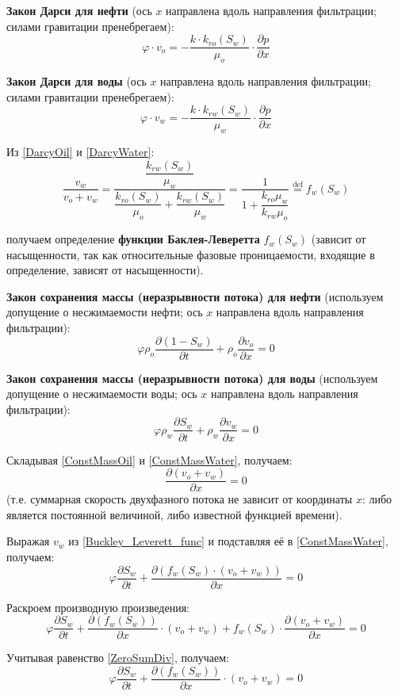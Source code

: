 \documentclass[a4paper,14pt]{extarticle}
\newcommand{\beq}{\begin{equation}}
\newcommand{\eeq}{\end{equation}}
\begin{document}
\textbf{Закон Дарси для нефти} (ось $x$ направлена вдоль направления фильтрации; силами гравитации пренебрегаем):
\beq\label{DarcyOil}
\varphi\cdot v_o=-\frac{k\cdot k_{ro}(S_w)}{\mu_o}\cdot\frac{\partial p}{\partial x}
\eeq

\textbf{Закон Дарси для воды} (ось $x$ направлена вдоль направления фильтрации; силами гравитации пренебрегаем):
\beq\label{DarcyWater}
\varphi\cdot v_w=-\frac{k\cdot k_{rw}(S_w)}{\mu_w}\cdot\frac{\partial p}{\partial x}
\eeq

Из \eqref{DarcyOil} и \eqref{DarcyWater}:
\beq\label{Buckley_Leverett_func}
\dfrac{v_w}{v_o+v_w}=\dfrac{\dfrac{k_{rw}(S_w)}{\mu_w}}{\dfrac{k_{ro}(S_w)}{\mu_o}+\dfrac{k_{rw}(S_w)}{\mu_w}}=\frac{1}{1+\dfrac{k_{ro}\mu_w}{k_{rw}\mu_o}}\stackrel{\text{def}}{=}f_w(S_w)
\eeq

получаем определение \textbf{функции Баклея-Леверетта} $f_w(S_w)$ (зависит от насыщенности, так как относительные фазовые проницаемости, входящие в определение, зависят от насыщенности).

\textbf{Закон сохранения массы (неразрывности потока) для нефти} (используем допущение о несжимаемости нефти; ось $x$ направлена вдоль направления фильтрации):
\beq\label{ConstMassOil}
\varphi\rho_{o}\frac{\partial\left(1-S_w\right)}{\partial t}+\rho_o\frac{\partial v_o}{\partial x}=0
\eeq

\textbf{Закон сохранения массы (неразрывности потока) для воды} (используем допущение о несжимаемости воды; ось $x$ направлена вдоль направления фильтрации):
\beq\label{ConstMassWater}
\varphi\rho_{w}\frac{\partial S_w}{\partial t}+\rho_w\frac{\partial v_w}{\partial x}=0
\eeq

Складывая \eqref{ConstMassOil} и \eqref{ConstMassWater}, получаем:
\beq\label{ZeroSumDiv}
\frac{\partial\left(v_o+v_w\right)}{\partial x}=0
\eeq
(т.е. суммарная скорость двухфазного потока не зависит от координаты $x$: либо является постоянной величиной, либо известной функцией времени).

Выражая $v_w$ из \eqref{Buckley_Leverett_func} и подставляя её в \eqref{ConstMassWater}, получаем:
\beq
\varphi\frac{\partial S_w}{\partial t}+\frac{\partial\!\left(f_w(S_w)\cdot(v_o+v_w)\right)}{\partial x}=0
\eeq

Раскроем производную произведения:
\beq
\varphi\frac{\partial S_w}{\partial t}+\frac{\partial\!\left(f_w(S_w)\right)}{\partial x}\cdot\left(v_o+v_w\right)+f_w(S_w)\cdot\frac{\partial\left(v_o+v_w\right)}{\partial x}=0
\eeq

Учитывая равенство \eqref{ZeroSumDiv}, получаем:
\beq\label{Buckley_Leverett_eqn}
\varphi\frac{\partial S_w}{\partial t}+\frac{\partial\!\left(f_w(S_w)\right)}{\partial x}\cdot\left(v_o+v_w\right)=0
\eeq
\end{document}
